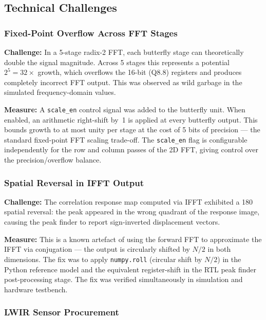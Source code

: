 \documentclass[12pt,a4paper]{article}
\begin{document}
\subsection{Technical Challenges}

\subsubsection{Fixed-Point Overflow Across FFT Stages}

\textbf{Challenge:} In a 5-stage radix-2 FFT, each butterfly stage can theoretically double the signal magnitude. Across 5 stages this represents a potential $2^5 = 32\times$ growth, which overflows the 16-bit (Q8.8) registers and produces completely incorrect FFT output. This was observed as wild garbage in the simulated frequency-domain values.

\textbf{Measure:} A \texttt{scale\_en} control signal was added to the butterfly unit. When enabled, an arithmetic right-shift by~1 is applied at every butterfly output. This bounds growth to at most unity per stage at the cost of 5 bits of precision --- the standard fixed-point FFT scaling trade-off. The \texttt{scale\_en} flag is configurable independently for the row and column passes of the 2D FFT, giving control over the precision/overflow balance.

\subsubsection{Spatial Reversal in IFFT Output}

\textbf{Challenge:} The correlation response map computed via IFFT exhibited a 180\textdegree{} spatial reversal: the peak appeared in the wrong quadrant of the response image, causing the peak finder to report sign-inverted displacement vectors.

\textbf{Measure:} This is a known artefact of using the forward FFT to approximate the IFFT via conjugation --- the output is circularly shifted by $N/2$ in both dimensions. The fix was to apply \texttt{numpy.roll} (circular shift by $N/2$) in the Python reference model and the equivalent register-shift in the RTL peak finder post-processing stage. The fix was verified simultaneously in simulation and hardware testbench.

\subsubsection{LWIR Sensor Procurement}
\end{document}
